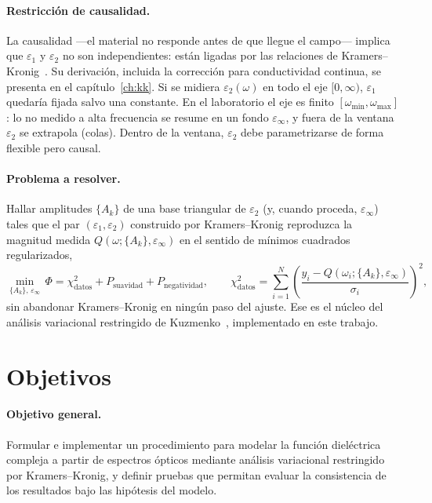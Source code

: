 \paragraph{Restricci\'on de causalidad.}
La causalidad ---el material no responde antes de que llegue el campo--- implica que $\varepsilon_1$ y $\varepsilon_2$ no son independientes: est\'an ligadas por las relaciones de Kramers--Kronig~\cite{Jackson,electrodynamics}.
Su derivaci\'on, incluida la correcci\'on para conductividad continua, se presenta en el cap\'itulo~\ref{ch:kk}.
Si se midiera $\varepsilon_2(\omega)$ en todo el eje $[0,\infty)$, $\varepsilon_1$ quedar\'ia fijada salvo una constante.
En el laboratorio el eje es finito $[\omega_{\min},\omega_{\max}]$:
lo no medido a alta frecuencia se resume en un fondo $\varepsilon_\infty$, y fuera de la ventana $\varepsilon_2$ se extrapola (colas).
Dentro de la ventana, $\varepsilon_2$ debe parametrizarse de forma flexible pero causal.

\paragraph{Problema a resolver.}
Hallar amplitudes $\{A_k\}$ de una base triangular de $\varepsilon_2$ (y, cuando proceda, $\varepsilon_\infty$) tales que el par
$(\varepsilon_1,\varepsilon_2)$ construido por Kramers--Kronig reproduzca la magnitud medida $Q(\omega;\{A_k\},\varepsilon_\infty)$ en el sentido de m\'inimos cuadrados regularizados,
\begin{equation}
\min_{\{A_k\},\,\varepsilon_\infty}\,
\Phi
=\chi^{2}_{\mathrm{datos}}+P_{\mathrm{suavidad}}+P_{\mathrm{negatividad}},
\qquad
\chi^{2}_{\mathrm{datos}}
=\sum_{i=1}^{N}
\left(\frac{y_i-Q(\omega_i;\{A_k\},\varepsilon_\infty)}{\sigma_i}\right)^{2},
\end{equation}
sin abandonar Kramers--Kronig en ning\'un paso del ajuste.
Ese es el n\'ucleo del an\'alisis variacional restringido de Kuzmenko~\cite{constrained}, implementado en este trabajo.

\section{Objetivos}

\paragraph{Objetivo general.}
Formular e implementar un procedimiento para modelar la funci\'on diel\'ectrica compleja a partir de espectros \'opticos mediante an\'alisis variacional restringido por Kramers--Kronig, y definir pruebas que permitan evaluar la consistencia de los resultados bajo las hip\'otesis del modelo.

